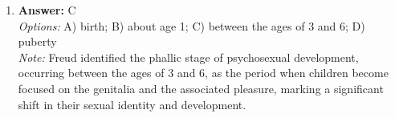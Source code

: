 \documentclass[12pt]{article}
\begin{document}
\begin{enumerate}[label=\arabic*.]
\\ \textit{Note:} Arabidopsis is advantageous for plant genetic research because its small size and genome facilitate easier manipulation and analysis, while its low cost makes it accessible for extensive experimentation.
\item \textbf{Answer:} C
\\ \textit{Options:} A) birth; B) about age 1; C) between the ages of 3 and 6; D) puberty
\\ \textit{Note:} Freud identified the phallic stage of psychosexual development, occurring between the ages of 3 and 6, as the period when children become focused on the genitalia and the associated pleasure, marking a significant shift in their sexual identity and development.
\end{enumerate}
\end{document}

